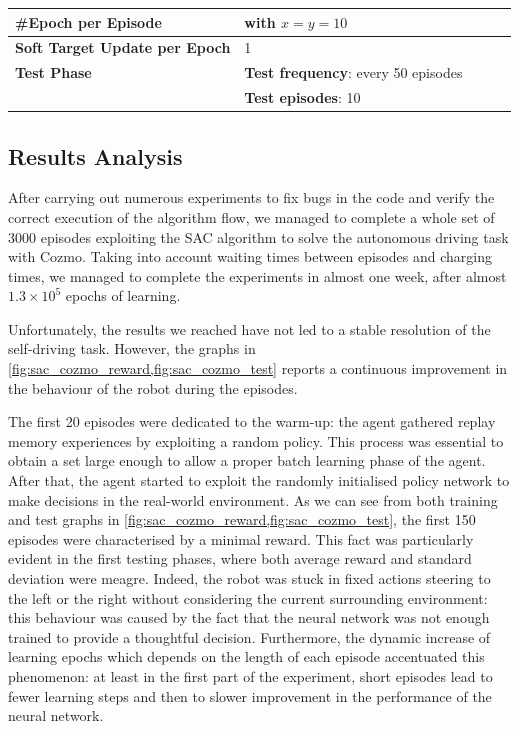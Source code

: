\begin{table}[!h]
{\begin{tabular}{@{}lllll@{}}
			\textbf{\#Epoch per Episode}          & \Vref{eq:learning-step} with $x = y = 10$              \\\midrule
			\textbf{Soft Target Update per Epoch} & 1                                                      \\\midrule
			\textbf{Test Phase}                   & \textbf{Test frequency}: every 50 episodes             \\
			                                      & \textbf{Test episodes}: 10                             \\
			\bottomrule
		\end{tabular}}
\end{table}


\subsection{Results Analysis} \label{ch5:results}

After carrying out numerous experiments to fix bugs in the code and verify the correct execution of the algorithm flow, we managed to complete a whole set of 3000 episodes exploiting the SAC algorithm to solve the autonomous driving task with Cozmo.
Taking into account waiting times between episodes and charging times, we managed to complete the experiments in almost one week, after almost $1.3\times 10^5$ epochs of learning.

Unfortunately, the results we reached have not led to a stable resolution of the self-driving task.
However, the graphs in \vref{fig:sac_cozmo_reward,fig:sac_cozmo_test} reports a continuous improvement in the behaviour of the robot during the episodes.

The first 20 episodes were dedicated to the warm-up: the agent gathered replay memory experiences by exploiting a random policy.
This process was essential to obtain a set large enough to allow a proper batch learning phase of the agent.
After that, the agent started to exploit the randomly initialised policy network to make decisions in the real-world environment.
As we can see from both training and test graphs in \vref{fig:sac_cozmo_reward,fig:sac_cozmo_test}, the first 150 episodes were characterised by a minimal reward.
This fact was particularly evident in the first testing phases, where both average reward and standard deviation were meagre.
Indeed, the robot was stuck in fixed actions steering to the left or the right without considering the current surrounding environment: this behaviour was caused by the fact that the neural network was not enough trained to provide a thoughtful decision.
Furthermore, the dynamic increase of learning epochs which depends on the length of each episode accentuated this phenomenon: at least in the first part of the experiment, short episodes lead to fewer learning steps and then to slower improvement in the performance of the neural network.

